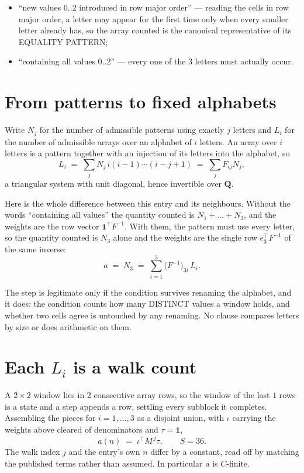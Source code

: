 \documentclass[11pt,a4paper]{article}
\theoremstyle{plain}
\theoremstyle{definition}
\begin{document}
\begin{itemize}
\item ``new values $0..2$ introduced in row major order'' --- reading the cells in row major
order, a letter may appear for the first time only when every smaller letter already has, so
the array counted is the canonical representative of its EQUALITY PATTERN;
\item ``containing all values $0..2$'' --- every one of the $3$ letters must actually
occur.
\end{itemize}


\section{From patterns to fixed alphabets}

Write $N_j$ for the number of admissible patterns using exactly $j$ letters and $L_i$ for the
number of admissible arrays over an alphabet of $i$ letters. An array over $i$ letters is a
pattern together with an injection of its letters into the alphabet, so
\[
L_i\;=\;\sum_{j} N_j\,i(i-1)\cdots(i-j+1)\;=\;\sum_j F_{ij}N_j ,
\]
a triangular system with unit diagonal, hence invertible over $\mathbf{Q}$.

Here is the whole difference between this entry and its neighbours. Without the words
``containing all values'' the quantity counted is $N_1+\dots+N_{3}$, and the weights are
the row vector $\mathbf{1}^{\!\top}F^{-1}$. With them, the pattern must use every letter,
so the quantity counted is $N_{3}$ alone and the weights are the single row
$e_{3}^{\!\top}F^{-1}$ of the same inverse:
\[
a\;=\;N_{3}\;=\;\sum_{i=1}^{3}\bigl(F^{-1}\bigr)_{3i}\,L_i .
\]

The step is legitimate only if the condition survives renaming the alphabet, and it does: the
condition counts how many DISTINCT values a window holds, and whether two cells agree is
untouched by any renaming. No clause compares letters by size or does arithmetic on them.

\section{Each $L_i$ is a walk count}

A $2\times2$ window lies in $2$ consecutive array rows, so the window of the last
$1$ rows is a state and a step appends a row, settling every subblock it completes.
Assembling the pieces for $i=1,\dots,3$ as a disjoint union, with $\iota$ carrying the
weights above cleared of denominators and $\tau=\mathbf{1}$,
\[
a(n)\;=\;\iota^{\!\top}M^{\,j}\tau ,\qquad S=36.
\]
The walk index $j$ and the entry's own $n$ differ by a constant, read off by matching the
published terms rather than assumed. In particular $a$ is $C$-finite.
\end{document}
